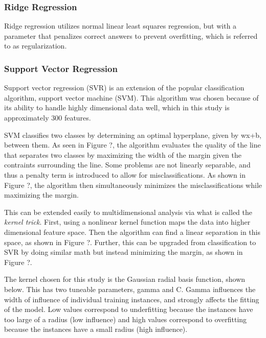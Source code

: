 \documentclass{anstrans}
\begin{document}
\subsubsection{Ridge Regression}


Ridge regression utilizes normal linear least squares regression, but with a
parameter that penalizes correct answers to prevent overfitting, which is
referred to as regularization. 

\subsubsection{Support Vector Regression}


Support vector regression (SVR) is an extension of the popular classification
algorithm, support vector machine (SVM).  This algorithm was chosen because of
its ability to handle highly dimensional data well, which in this study is
approximately 300 features. 

SVM classifies two classes by determining an optimal hyperplane, given by wx+b,
between them.  As seen in Figure ?, the algorithm evaluates the quality of the
line that separates two classes by maximizing the width of the margin given the
contraints surrounding the line.  Some problems are not linearly separable, and
thus a penalty term is introduced to allow for misclassifications. As shown in
Figure ?, the algorithm then simultaneously minimizes the misclassifications
while maximizing the margin. 

This can be extended easily to multidimensional analysis via what is called the
\textit{kernel trick}.  First, using a nonlinear kernel function maps the data
into higher dimensional feature space. Then the algorithm can find a linear
separation in this space, as shown in Figure ?. Further, this can be upgraded
from classification to SVR by doing similar math but instead minimizing the
margin, as shown in Figure ?. 

The kernel chosen for this study is the Gaussian radial basis function, shown
below. This has two tuneable parameters, gamma and C. Gamma influences the
width of influence of individual training instances, and strongly affects the
fitting of the model. Low values correspond to underfitting because the
instances have too large of a radius (low influence) and high values correspond
to overfitting because the instances have a small radius (high influence). 
\end{document}
